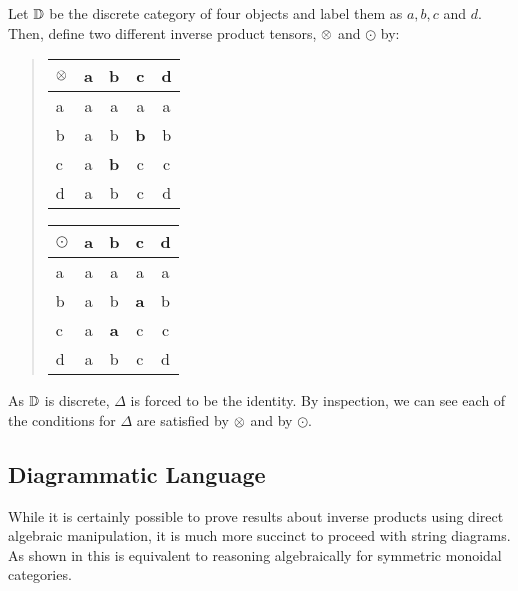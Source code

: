 Let $\mathbb{D}$ be the discrete category of four objects and label them as $a,b,c$ and $d$. Then, define
two different inverse product tensors, $\otimes$ and $\odot$ by:
\begin{quote}
  \qquad\qquad
  \begin{tabular}{|l||c|c|c|c|}
    \hline
    $\otimes$&a&b&c&d\\ \hline \hline
    a&a&a&a&a\\ \hline
    b&a&b&\textbf{b}&b\\ \hline
    c&a&\textbf{b}&c&c \\ \hline
    d&a&b&c&d \\ \hline
  \end{tabular}
  \hfil
  \begin{tabular}{|l||c|c|c|c|}
    \hline
    $\odot$&a&b&c&d\\ \hline \hline
    a&a&a&a&a\\ \hline
    b&a&b&\textbf{a}&b\\ \hline
    c&a&\textbf{a}&c&c \\ \hline
    d&a&b&c&d \\ \hline
  \end{tabular}
  \qquad \qquad
\end{quote}

As $\mathbb{D}$ is discrete, $\Delta$ is forced to be the identity. By inspection, we can see each of
the conditions for $\Delta$ are satisfied by $\otimes$ and by $\odot$.

\subsection{Diagrammatic Language} %
\label{sub:diagrammatic_language}

While it is certainly possible to prove results about inverse products using direct algebraic
manipulation, it is much more succinct to proceed with string diagrams. As shown in
\cite{street-ross-1991-GTC-I} this is equivalent to reasoning algebraically for symmetric monoidal
categories.


